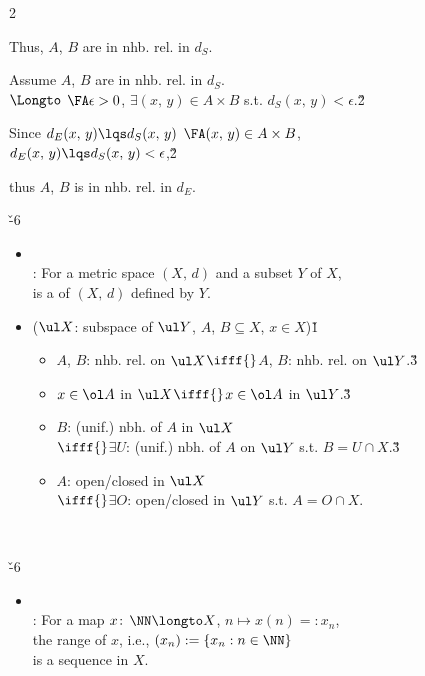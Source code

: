 \documentclass[dvipdfmx,a4paper,titlepage,9pt]{jsarticle}
\begin{document}
\begin{multicols*}{2}
\begin{itemize}[label=-]
\begin{Pfbox}
Thus, $A$, $B$ are in nhb. rel. in $d_S$.
\end{Pfbox}

\vfill\null\columnbreak

\begin{Pfbox}[{[(c)${}\Longto{}$(a)]}]
Assume $A$, $B$ are in nhb. rel. in $d_S$.\\
$\Longto$ $\FA\epsilon>0$, $\exists(x,\,y)\in A\times B$ s.t. $d_S(x,\,y)<\epsilon$.\v2

Since $d_E(x,\,y)\lqs d_S(x,\,y)$ $\FA(x,\,y)\in A\times B$,\\
$d_E(x,\,y)\lqs d_S(x,\,y)<\epsilon$,\v2

thus $A$, $B$ is in nhb. rel. in $d_E$.
\end{Pfbox}
\end{itemize}

\;

\v{-6}
\begin{itemize}[label=-]
\item{}\\
: For a metric space $(X,\,d)$ and a subset $Y$ of $X$,\\
\;\; is a  of $(X,\,d)$ defined by $Y$.\\

\item{} ($\ul X$: subspace of $\ul Y$, $A$, $B\subseteq X$, $x\in X$)\v1
\begin{itemize}[label=\Cdot]
\setlength{\leftskip}{-5pt}
\item $A$, $B$: nhb. rel. on $\ul X$\;${}\ifff{}$\;$A$, $B$: nhb. rel. on $\ul Y$.\v3
\item $x\in\ol A$ in $\ul X$\;${}\ifff{}$\;$x\in\ol A$ in $\ul Y$.\v3
\item $B$: (unif.) nbh. of $A$ in $\ul X$\\
$\ifff{}$\;$\exists U$: (unif.) nbh. of $A$ on $\ul Y$ s.t. $B=U\cap X$.\v3
\item $A$: open/closed in $\ul X$\\
$\ifff{}$\;$\exists O$: open/closed in $\ul Y$ s.t. $A=O\cap X$.
\end{itemize}
\end{itemize}

\; \\


\v{-6}
\begin{itemize}[label=-]
\item{}\\
: For a map $x\!:\,\NN\longto X$,\; $n\longmapsto x(n)=:x_n$,\\
\;\;the range of $x$, i.e., $(x_n):=\{x_n:n\in\NN\}$\\
\;\;is a sequence in $X$. \\


\end{itemize}
\end{multicols*}
\end{document}
